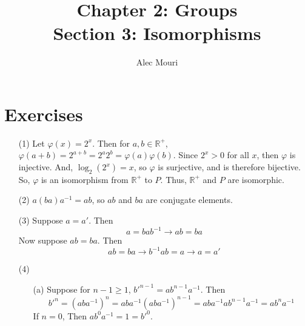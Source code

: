 \documentclass[12pt]{article}
\begin{document}
\title{Chapter 2: Groups \\ Section 3: Isomorphisms}
\author{Alec Mouri}

\maketitle
\section*{Exercises}
\begin{itemize}
\item[(1)]
Let $\varphi(x) = 2^x$. Then for $a, b \in \mathbb{R}^+$, $\varphi(a + b) = 2^{a + b} = 2^a2^b = \varphi(a)\varphi(b)$. Since $2^x > 0$ for all $x$, then $\varphi$ is injective. And, $\log_2(2^x) = x$, so $\varphi$ is surjective, and is therefore bijective. So, $\varphi$ is an isomorphism from $\mathbb{R}^+$ to $P$. Thus, $\mathbb{R}^+$ and $P$ are isomorphic.
\item[(2)]
$a(ba)a^{-1} = ab$, so $ab$ and $ba$ are conjugate elements.
\item[(3)]
Suppose $a = a'$. Then
$$a = bab^{-1} \rightarrow ab = ba$$
Now suppose $ab = ba$. Then
$$ab = ba \rightarrow b^{-1}ab = a \rightarrow a = a'$$
\item[(4)]
\begin{itemize}
\item[(a)]
Suppose for $n - 1 \geq 1$, $b'^{n-1} = ab^{n-1}a^{-1}$. Then 
$$b'^n = (aba^{-1})^n = aba^{-1}(aba^{-1})^{n-1} = aba^{-1}ab^{n-1}a^{-1} = ab^na^{-1}$$
If $n = 0$, Then $ab^0a^{-1} = 1 = b'^0$.


\end{itemize}
\end{itemize}
\end{document}
